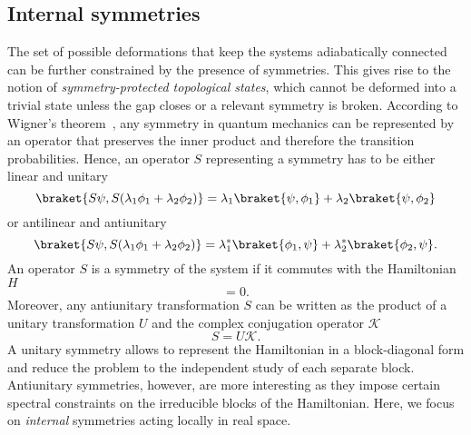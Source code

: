 \subsection{Internal symmetries}
The set of possible deformations that keep the systems adiabatically connected can be further constrained by the presence of symmetries. This gives rise to the notion of \emph{symmetry-protected topological states}, which cannot be deformed into a trivial state unless the gap closes or a relevant symmetry is broken. According to Wigner's theorem~\cite{wigner2013group}, any symmetry in quantum mechanics can be represented by an operator that preserves the inner product and therefore the transition probabilities. Hence, an operator $S$ representing a symmetry has to be either linear and unitary
\begin{equation}
\braket{ S \psi, S ( \lambda_1 \phi_1 + \lambda_2 \phi_2 )} = \lambda_1 \braket{\psi, \phi_1} + \lambda_2 \braket{\psi, \phi_2}
\label{eq:s-linear}
\end{equation}
or antilinear and antiunitary
\begin{equation}
\braket{ S\psi, S( \lambda_1 \phi_1 + \lambda_2 \phi_2 )} = \lambda_1^*  \braket{\phi_1, \psi} + \lambda_2^* \braket{\phi_2, \psi}.
\label{eq:s-antilinear}
\end{equation}
An operator $S$ is a symmetry of the system if it commutes with the Hamiltonian $H$
\begin{equation}
[H, S] = 0.
\end{equation}
Moreover, any antiunitary transformation $S$ can be written as the product of a unitary transformation $U$ and the complex conjugation operator $\mathcal{K}$
\begin{equation}
S = U \mathcal{K}
\label{eq:anti}.
\end{equation}
A unitary symmetry allows to represent the Hamiltonian in a block-diagonal form and reduce the problem to the independent study of each separate block. Antiunitary symmetries, however, are more interesting as they impose certain spectral constraints on the irreducible blocks of the Hamiltonian. Here, we focus on \emph{internal} symmetries acting locally in real space.

